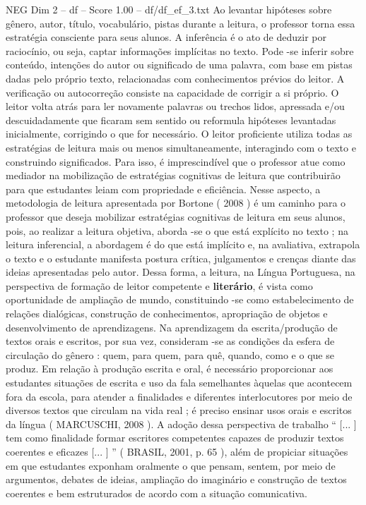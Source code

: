 \begin{textsample}{NEG Dim 2 – df – Score 1.00 – df/df\_ef\_3.txt}
Ao levantar hipóteses sobre gênero, autor, título, vocabulário, pistas durante a leitura, o professor torna essa estratégia consciente para seus alunos.
A inferência é o ato de deduzir por raciocínio, ou seja, captar informações implícitas no texto.
Pode -se inferir sobre conteúdo, intenções do autor ou significado de uma palavra, com base em pistas dadas pelo próprio texto, relacionadas com conhecimentos prévios do leitor.
A verificação ou autocorreção consiste na capacidade de corrigir a si próprio.
O leitor volta atrás para ler novamente palavras ou trechos lidos, apressada e/ou descuidadamente que ficaram sem sentido ou reformula hipóteses levantadas inicialmente, corrigindo o que for necessário.
O leitor proficiente utiliza todas as estratégias de leitura mais ou menos simultaneamente, interagindo com o texto e construindo significados.
Para isso, é imprescindível que o professor atue como mediador na mobilização de estratégias cognitivas de leitura que contribuirão para que estudantes leiam com propriedade e eficiência.
Nesse aspecto, a metodologia de leitura apresentada por Bortone ( 2008 ) é um caminho para o professor que deseja mobilizar estratégias cognitivas de leitura em seus alunos, pois, ao realizar a leitura objetiva, aborda -se o que está explícito no texto ; na leitura inferencial, a abordagem é do que está implícito e, na avaliativa, extrapola o texto e o estudante manifesta postura crítica, julgamentos e crenças diante das ideias apresentadas pelo autor.
Dessa forma, a leitura, na Língua Portuguesa, na perspectiva de formação de leitor competente e \textbf{literário}, é vista como oportunidade de ampliação de mundo, constituindo -se como estabelecimento de relações dialógicas, construção de conhecimentos, apropriação de objetos e desenvolvimento de aprendizagens.
Na aprendizagem da escrita/produção de textos orais e escritos, por sua vez, consideram -se as condições da esfera de circulação do gênero : quem, para quem, para quê, quando, como e o que se produz.
Em relação à produção escrita e oral, é necessário proporcionar aos estudantes situações de escrita e uso da fala semelhantes àquelas que acontecem fora da escola, para atender a finalidades e diferentes interlocutores por meio de diversos textos que circulam na vida real ; é preciso ensinar usos orais e escritos da língua ( MARCUSCHI, 2008 ).
A adoção dessa perspectiva de trabalho “ [... ] tem como finalidade formar escritores competentes capazes de produzir textos coerentes e eficazes [... ] ” ( BRASIL, 2001, p. 65 ), além de propiciar situações em que estudantes exponham oralmente o que pensam, sentem, por meio de argumentos, debates de ideias, ampliação do imaginário e construção de textos coerentes e bem estruturados de acordo com a situação comunicativa.

\end{textsample}
